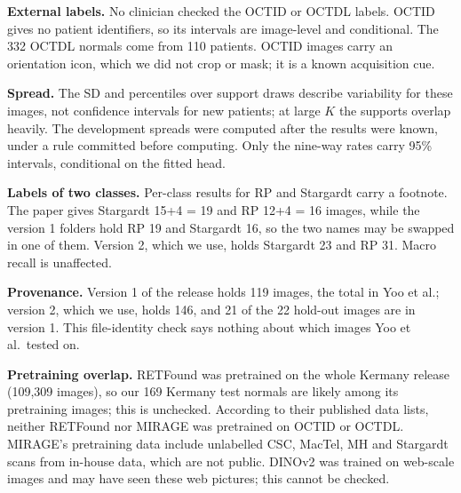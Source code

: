 \documentclass[conference]{IEEEtran}
\begin{document}
\textbf{External labels.} No clinician checked the OCTID or OCTDL labels. OCTID gives no patient identifiers, so its intervals are image-level and conditional. The 332 OCTDL normals come from 110 patients. OCTID images carry an orientation icon, which we did not crop or mask; it is a known acquisition cue.

\textbf{Spread.} The SD and percentiles over support draws describe variability for these images, not confidence intervals for new patients; at large $K$ the supports overlap heavily. The development spreads were computed after the results were known, under a rule committed before computing. Only the nine-way rates carry 95\% intervals, conditional on the fitted head.

\textbf{Labels of two classes.} Per-class results for RP and Stargardt carry a footnote. The paper gives Stargardt 15+4 = 19 and RP 12+4 = 16 images, while the version 1 folders hold RP 19 and Stargardt 16, so the two names may be swapped in one of them. Version 2, which we use, holds Stargardt 23 and RP 31. Macro recall is unaffected.

\textbf{Provenance.} Version 1 of the release holds 119 images, the total in Yoo et al.; version 2, which we use, holds 146, and 21 of the 22 hold-out images are in version 1. This file-identity check says nothing about which images Yoo et al.\ tested on.

\textbf{Pretraining overlap.} RETFound was pretrained on the whole Kermany release (109,309 images), so our 169 Kermany test normals are likely among its pretraining images; this is unchecked. According to their published data lists, neither RETFound nor MIRAGE was pretrained on OCTID or OCTDL. MIRAGE's pretraining data include unlabelled CSC, MacTel, MH and Stargardt scans from in-house data, which are not public. DINOv2 was trained on web-scale images and may have seen these web pictures; this cannot be checked.
\end{document}
